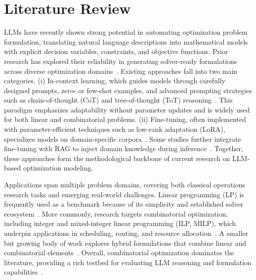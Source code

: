 \documentclass[review,12pt]{elsarticle}
\begin{document}
\vspace{-3mm}
\section{Literature Review}\label{sec:litreturereview}
\vspace{-1mm}
LLMs have recently shown strong potential in automating optimization problem formulation, translating natural language descriptions into mathematical models with explicit decision variables, constraints, and objective functions. Prior research has explored their reliability in generating solver-ready formulations across diverse optimization domains~\cite{li2023synthesizing,ahmed2024lm4opt,huang2024optibench,xiao2023chain}.
Existing approaches fall into two main categories. (i) In-context learning, which guides models through carefully designed prompts, zero- or few-shot examples, and advanced prompting strategies such as chain-of-thought (CoT) and tree-of-thought (ToT) reasoning~\cite{wang2024bpp,li2024nl2or,wang2024large}. This paradigm emphasizes adaptability without parameter updates and is widely used for both linear and combinatorial problems. (ii) Fine-tuning, often implemented with parameter-efficient techniques such as low-rank adaptation (LoRA), specializes models on domain-specific corpora~\cite{abgaryan2024llms,anonymous2024starjob,tang2024orlm}. Some studies further integrate fine-tuning with RAG to inject domain knowledge during inference~\cite{anonymous2024droc,zhang2024generative}.
Together, these approaches form the methodological backbone of current research on LLM-based optimization modeling.

Applications span multiple problem domains, covering both classical operations research tasks and emerging real-world challenges. Linear programming (LP) is frequently used as a benchmark because of its simplicity and established solver ecosystem~\cite{li2025abstract,deng24cafa}. More commonly, research targets combinatorial optimization, including integer and mixed-integer linear programming (ILP, MILP), which underpin applications in scheduling, routing, and resource allocation~\cite{xiao2023chain,abgaryan2024llms,anonymous2024starjob,wang2024leveraging}. A smaller but growing body of work explores hybrid formulations that combine linear and combinatorial elements~\cite{tang2024orlm,jiang2024llmopt}. Overall, combinatorial optimization dominates the literature, providing a rich testbed for evaluating LLM reasoning and formulation capabilities~\cite{huang2024optibench,zhou2024llmsolver}.
\end{document}
